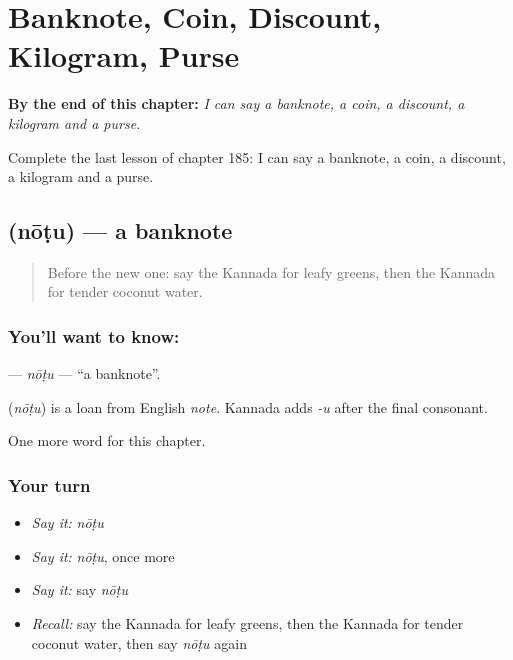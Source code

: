 
\chapter{Banknote, Coin, Discount, Kilogram, Purse}
\label{ch:ka-banknote-coin-discount-kilogram-purse}

\begin{chapteropening}
\textbf{By the end of this chapter:} \emph{I can say a banknote, a coin, a discount, a kilogram and a purse.}

Complete the last lesson of chapter 185: I can say a banknote, a coin, a discount, a kilogram and a purse.
\end{chapteropening}

\section[\texorpdfstring{\kn{ನೋಟು} (nōṭu)}{ನೋಟು (nōṭu)}]{ (nōṭu) — a banknote}

\label{lesson:KA-C185-notu}



\begin{quote}
Before the new one: say the Kannada for leafy greens, then the Kannada for tender coconut water.
\end{quote}

\subsection*{You'll want to know: }
\textbf{} — \emph{nōṭu} — \textquotedblleft{}a banknote\textquotedblright{}.

\begin{cousinweb}
\textbf{} (\emph{nōṭu}) is a loan from English \emph{note}. Kannada adds \emph{-u} after the final consonant.
\end{cousinweb}

\begin{grammarlens}[title={What you've built}]
One more word for this chapter.
\end{grammarlens}

\subsection*{Your turn}
\begin{itemize}
\raggedright
  \item \emph{Say it:} \emph{nōṭu}
  \item \emph{Say it:} \emph{nōṭu}, once more
  \item \emph{Say it:} say \emph{nōṭu}
  \item \emph{Recall:} say the Kannada for leafy greens, then the Kannada for tender coconut water, then say \emph{nōṭu} again
\end{itemize}

